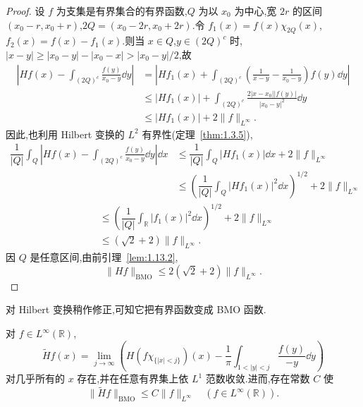 \begin{proof}
设 $f$ 为支集是有界集合的有界函数,$Q$ 为以 $x_{0}$ 为中心,宽 $2r$ 的区间 $(x_{0} - r, x_{0} + r)$,$2Q = (x_{0} - 2r, x_{0} + 2r)$.令 $f_{1}(x) = f(x)\chi_{2Q}(x)$,$f_{2}(x) = f(x) - f_{1}(x)$.则当 $x \in Q$,$y \in (2Q)^{c}$ 时,$|x - y| \geq |x_{0} - y| - |x_{0} - x| > |x_{0} - y|/2$,故
\begin{align*}
\left|Hf(x) - \displaystyle\int_{(2Q)^{c}}\frac{f(y)}{x_{0} - y}\dd y\right| & = \left|Hf_{1}(x) + \displaystyle\int_{(2Q)^{c}}\left(\frac{1}{x - y} - \frac{1}{x_{0} - y}\right)f(y)\dd y\right| \\
& \leq |Hf_{1}(x)| + \displaystyle\int_{(2Q)^{c}}\frac{2|x - x_{0}||f(y)|}{|x_{0} - y|^{2}}\dd y \\
& \leq |Hf_{1}(x)| + 2\| f \|_{L^{\infty}}.
\end{align*}
因此,也利用 Hilbert 变换的 $L^{2}$ 有界性(定理~\ref{thm:1.3.5}),
\begin{align*}
\dfrac{1}{|Q|}\displaystyle\int_{Q}\left|Hf(x) - \int_{(2Q)^{c}}\frac{f(y)}{x_{0} - y}\dd y\right|\dd x & \leq \dfrac{1}{|Q|}\int_{Q}|Hf_{1}(x)|\dd x + 2\| f \|_{L^{\infty}} \\
& \leq \left(\dfrac{1}{|Q|}\displaystyle\int_{Q}|Hf_{1}(x)|^{2}\dd x\right)^{1/2} + 2\| f \|_{L^{\infty}}
\end{align*}
\begin{align*}
&\leq \left(\dfrac{1}{|Q|}\displaystyle\int_{\mathbb{R}}|f_{1}(x)|^{2}\dd x\right)^{1/2} + 2\| f \|_{L^{\infty}} \\
&\leq (\sqrt{2} + 2)\| f \|_{L^{\infty}}.
\end{align*}
因 $Q$ 是任意区间,由前引理~\ref{lem:1.13.2},
\begin{equation*}
\| Hf \|_{\mathrm{BMO}} \leq 2(\sqrt{2} + 2)\| f \|_{L^{\infty}}.
\end{equation*}
\end{proof}

对 Hilbert 变换稍作修正,可知它把有界函数变成 BMO 函数.

\begin{theorem}\label{thm:1.13.4}
对 $f \in L^{\infty}(\mathbb{R})$,
\begin{equation*}
\tilde{H}f(x) = \lim_{j \to \infty}\left(H\left(f\chi_{\{|x| < j\}}\right)(x) - \frac{1}{\pi}\int_{1 < |y| < j}\frac{f(y)}{-y}\dd y\right)
\end{equation*}
对几乎所有的 $x$ 存在,并在任意有界集上依 $L^{1}$ 范数收敛.进而,存在常数 $C$ 使
\begin{equation*}
\| \tilde{H}f \|_{\mathrm{BMO}} \leq C\| f \|_{L^{\infty}} \quad (f \in L^{\infty}(\mathbb{R})).
\end{equation*}
\end{theorem}

